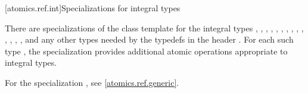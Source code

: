 [atomics.ref.int]{Specializations for integral types}

\pnum
{}%
There are specializations of the  class template
for the integral types
,
,
,
,
,
,
,
,
,
,
,
,
,
,
and any other types needed by the typedefs in the header .
For each such type ,
the specialization  provides
additional atomic operations appropriate to integral types.
\begin{note}
For the specialization , see \ref{atomics.ref.generic}.
\end{note}

